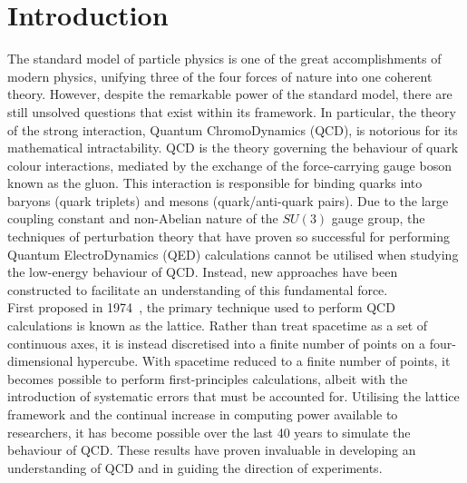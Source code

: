 
\chapter{Introduction}
\ifpdf
    \graphicspath{{Chapter1/Figs/Raster/}{Chapter1/Figs/PDF/}{Chapter1/Figs/}}
\else
    \graphicspath{{Chapter1/Figs/Vector/}{Chapter1/Figs/}}
\fi
The standard model of particle physics is one of the great accomplishments of modern physics, unifying three of the four forces of nature into one coherent theory. However, despite the remarkable power of the standard model, there are still unsolved questions that exist within its framework. In particular, the theory of the strong interaction, Quantum ChromoDynamics (QCD), is notorious for its mathematical intractability. QCD is the theory governing the behaviour of quark colour interactions, mediated by the exchange of the force-carrying gauge boson known as the gluon. This interaction is responsible for binding quarks into baryons (quark triplets) and mesons (quark/anti-quark pairs). Due to the large coupling constant and non-Abelian nature of the $SU(3)$ gauge group, the techniques of perturbation theory that have proven so successful for performing Quantum ElectroDynamics (QED) calculations cannot be utilised when studying the low-energy behaviour of QCD. Instead, new approaches have been constructed to facilitate an understanding of this fundamental force.\\

First proposed in 1974~\cite{Wilson:1974sk}, the primary technique used to perform QCD calculations is known as the lattice. Rather than treat spacetime as a set of continuous axes, it is instead discretised into a finite number of points on a four-dimensional hypercube. With spacetime reduced to a finite number of points, it becomes possible to perform first-principles calculations, albeit with the introduction of systematic errors that must be accounted for. Utilising the lattice framework and the continual increase in computing power available to researchers, it has become possible over the last 40 years to simulate the behaviour of QCD. These results have proven invaluable in developing an understanding of QCD and in guiding the direction of experiments.\\

